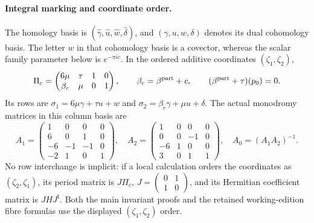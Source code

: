 \paragraph{Integral marking and coordinate order.}
The homology basis is
$(\hat\gamma,\hat u,\hat w,\hat\delta)$, and
$(\gamma,u,w,\delta)$ denotes its dual cohomology basis.
The letter $w$ in that cohomology basis is a covector, whereas the
scalar family parameter below is $e^{-\pi ic}$.
In the ordered additive coordinates $(\zeta_1,\zeta_2)$,
\[
 \Pi_c=\begin{pmatrix}6\mu&\tau&1&0\\
             \beta_c&\mu&0&1\end{pmatrix},
 \qquad \beta_c=\beta^{\rm part}+c,
 \qquad (\beta^{\rm part}+\tau)(p_0)=0.
\]
Its rows are $\sigma_1=6\mu\gamma+\tau u+w$ and
$\sigma_2=\beta_c\gamma+\mu u+\delta$.
The actual monodromy matrices in this column basis are
\[
 A_1=\begin{pmatrix}1&0&0&0\\6&0&1&0\\-6&-1&-1&0\\-2&1&0&1\end{pmatrix},
 \quad
 A_2=\begin{pmatrix}1&0&0&0\\0&0&-1&0\\-6&1&0&0\\3&0&1&1\end{pmatrix},
 \quad A_0=(A_1A_2)^{-1}.
\]
No row interchange is implicit: if a local calculation orders the
coordinates as $(\zeta_2,\zeta_1)$, its period matrix is
$J\Pi_c$, $J=\left(\begin{smallmatrix}0&1\\1&0\end{smallmatrix}\right)$,
and its Hermitian coefficient matrix is $JH J^{\mathsf t}$.
Both the main invariant proofs and the retained working-edition
fibre formulas use the displayed $(\zeta_1,\zeta_2)$ order.


